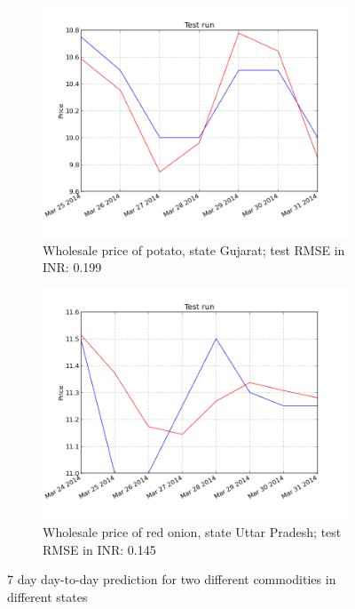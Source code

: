 \begin{figure}[!ht]
    \centering
        \begin{subfigure}[b]{.45\linewidth}
        \centering
        \includegraphics[width=\textwidth]{./img/plots/esn/daily/gujarat_potato_online_7d_1d.png}
        \caption{Wholesale price of potato, state Gujarat; test RMSE in INR: 0.199}
        \label{subfig:res_7d_1}
        \end{subfigure}
        \quad
        \begin{subfigure}[b]{.45\linewidth}
        \centering
        \includegraphics[width=\textwidth]{./img/plots/esn/daily/uttar_pradesh_redonion_7d_1d.png}
        \caption{Wholesale price of red onion, state Uttar Pradesh; test RMSE in INR: 0.145}
        \label{subfig:res_7d_2}
        \end{subfigure}
    \caption{7 day day-to-day prediction for two different commodities in different states}
    \label{fig:res_7d}
\end{figure}

